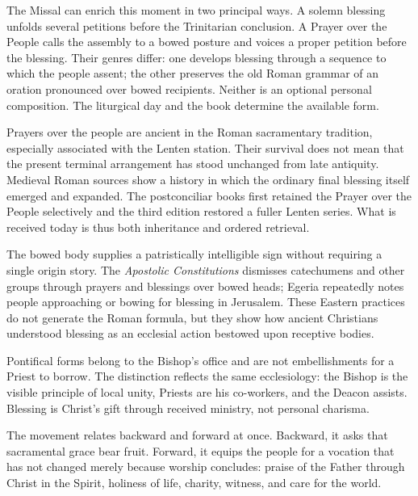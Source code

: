 The Missal can enrich this moment in two principal ways. A solemn blessing unfolds several petitions before the Trinitarian conclusion. A Prayer over the People calls the assembly to a bowed posture and voices a proper petition before the blessing. Their genres differ: one develops blessing through a sequence to which the people assent; the other preserves the old Roman grammar of an oration pronounced over bowed recipients. Neither is an optional personal composition. The liturgical day and the book determine the available form.

Prayers over the people are ancient in the Roman sacramentary tradition, especially associated with the Lenten station. Their survival does not mean that the present terminal arrangement has stood unchanged from late antiquity. Medieval Roman sources show a history in which the ordinary final blessing itself emerged and expanded. The postconciliar books first retained the Prayer over the People selectively and the third edition restored a fuller Lenten series. What is received today is thus both inheritance and ordered retrieval.

The bowed body supplies a patristically intelligible sign without requiring a single origin story. The \emph{Apostolic Constitutions} dismisses catechumens and other groups through prayers and blessings over bowed heads; Egeria repeatedly notes people approaching or bowing for blessing in Jerusalem. These Eastern practices do not generate the Roman formula, but they show how ancient Christians understood blessing as an ecclesial action bestowed upon receptive bodies.

Pontifical forms belong to the Bishop's office and are not embellishments for a Priest to borrow. The distinction reflects the same ecclesiology: the Bishop is the visible principle of local unity, Priests are his co-workers, and the Deacon assists. Blessing is Christ's gift through received ministry, not personal charisma.

The movement relates backward and forward at once. Backward, it asks that sacramental grace bear fruit. Forward, it equips the people for a vocation that has not changed merely because worship concludes: praise of the Father through Christ in the Spirit, holiness of life, charity, witness, and care for the world.


